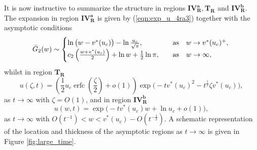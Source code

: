 \documentclass[11pt,a4paper]{article}
\newcommand{\eeref}[1]{(\ref{eqn:#1})}
\newcommand{\eelab}[1]{\label{eqn:#1}}
\newcommand{\ffref}[1]{\ref{fig:#1}}
\def\beq{\begin{equation}}
\def\eeq{\end{equation}}
\DeclareMathOperator\erfc{erfc}
\begin{document}
It is now instructive to summarize the structure in regions $\mathbf{IV_R^a}, \mathbf{T_R}$ and $\mathbf{IV_R^b}$. The expansion in region $\mathbf{IV_R^a}$ is given by \eeref{exp_u_4ra3} together with the asymptotic conditions 
 \beq \eelab{match_con_4l1}
\bar{G}_2(w) \sim  \begin{cases}  \ln \big( w - v^*(u_c)  \big) - \ln \frac{u_c}{\sqrt{\pi}} , \quad &  \mbox{as} \quad w \to v^*(u_c)^+,\\
  c_2\left( \frac{w + v^*(u_c) }{2} \right) + \ln w + \frac{1}{2} \ln \pi , \quad & \mbox{as} \quad w \to \infty, \end{cases} \\ 
\eeq
whilst in region $\mathbf{T_R}$
\beq \eelab{u_TR}
u(\zeta,t) = \left( \frac{1}{2} u_c \erfc \left( \frac{\zeta}{2} \right) + o(1) \right) \exp \bigg( -t v^*(u_c)^2 - t^{\frac{1}{2}} \zeta v^*(u_c) \bigg) ,
\eeq
as $t \to \infty$ with $\zeta = O(1)$, and in region $\mathbf{IV_R^b}$
\beq \eelab{u_4rb}
u(w,t) = \exp \bigg( -t v^*(u_c) w + \ln u_c + o(1) \bigg) ,
\eeq
as $t \to \infty$ with $O(t^{-1}) < w < v^*(u_c) - O(t^{-\frac{1}{2}})$. A schematic representation of the location and thickness of the asymptotic regions as $t \to \infty$ is given in Figure \ffref{large_time}.
\end{document}
